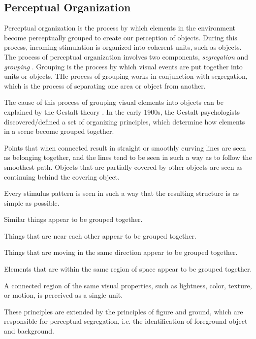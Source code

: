 \subsection{Perceptual Organization}
Perceptual organization is the process by which elements in the environment become perceptually grouped to create our perception of objects.
During this process, incoming stimulation is organized into coherent units, such as objects.
The process of perceptual organization involves two components, \emph{segregation} and \emph{grouping} \cite{Peterson:2013:PerceptualOrganization}.
Grouping is the process by which visual events are put together into units or objects.
THe process of grouping works in conjunction with segregation, which is the process of separating one area or object from another. 

The cause of this process of grouping visual elements into objects can be explained by the Gestalt theory \CN.
In the early 1900s, the Gestalt psychologists discovered/defined a set of organizing principles, which determine how elements in a scene become grouped together.
\begin{my_list_desc}
	\item[Good Continuation]
		Points that when connected result in straight or smoothly curving lines are seen as belonging together, and the lines tend to be seen in such a way as to follow the smoothest path.
		Objects that are partially covered by other objects are seen as continuing behind the covering object.
	
	\item[Pragnanz]
		Every stimulus pattern is seen in such a way that the resulting structure is as simple as possible.
	
	\item[Similarity]
		Similar things appear to be grouped together.
	
	\item[Proximity]
		Things that are near each other appear to be grouped together.
	
	\item[Commopn Fate]
		Things that are moving in the same direction appear to be grouped together.
	
	\item[Common Region]
		Elements that are within the same region of space appear to be grouped together.
	
	\item[Uniform Connectedness]
		A connected region of the same visual properties, such as lightness, color, texture, or motion, is perceived as a single unit.
\end{my_list_desc}
These principles are extended by the principles of figure and ground, which are responsible for perceptual segregation, i.e. the identification of foreground object and background.


